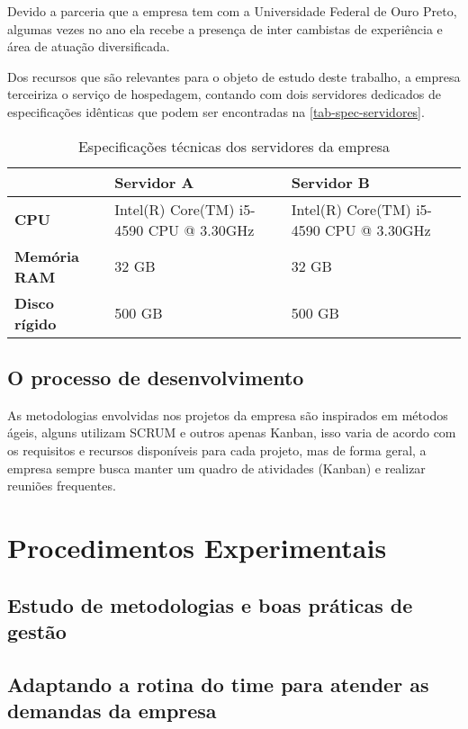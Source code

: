 \documentclass[
	12pt,				%
	openright,			%
	twoside,			%
	a4paper,			%
	english,			%
	french,				%
	spanish,			%
	brazil,				%
	]{abntex2}
\begin{document}
Devido a parceria que a empresa tem com a Universidade Federal de Ouro Preto, algumas vezes no ano ela recebe a presença de inter cambistas de experiência e área de atuação diversificada.

Dos recursos que são relevantes para o objeto de estudo deste trabalho, a empresa terceiriza o serviço de hospedagem, contando com dois servidores dedicados de especificações idênticas que podem ser encontradas na \autoref{tab-spec-servidores}.

\begin{table}[htb]
	\caption{Especificações técnicas dos servidores da empresa}

	\label{tab-spec-servidores}	
\begin{tabular}{p{3.85cm}|p{5.20cm}|p{5.20cm}}
	 & \textbf{Servidor A} & \textbf{Servidor B}  \\
	\hline
	\textbf{CPU} & Intel(R) Core(TM) i5-4590 CPU @ 3.30GHz & Intel(R) Core(TM) i5-4590 CPU @ 3.30GHz \\
	\hline
	\textbf{Memória RAM} & 32 GB & 32 GB \\
	\hline
	\textbf{Disco rígido} & 500 GB & 500 GB \\
\end{tabular}
\end{table}

\section{O processo de desenvolvimento} 

As metodologias envolvidas nos projetos da empresa são inspirados em métodos ágeis, alguns utilizam SCRUM e outros apenas Kanban, isso varia de acordo com os requisitos e recursos disponíveis para cada projeto, mas de forma geral, a empresa sempre busca manter um quadro de atividades (Kanban) e realizar reuniões frequentes.



\chapter{Procedimentos Experimentais}

\section{Estudo de metodologias e boas práticas de gestão}

\section{Adaptando a rotina do time para atender as demandas da empresa}
\end{document}
